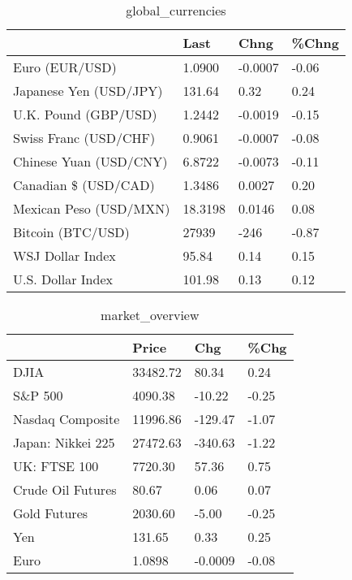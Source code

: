 \documentclass{article}%
\begin{document}
%


\begin{table}[htbp]%
\caption{global\_currencies}%
\centering%
\begin{adjustbox}{width=1\textwidth}%
\begin{tabular}{llll}
\toprule
                       &    Last &    Chng & \%Chng \\
\midrule
        Euro (EUR/USD) &  1.0900 & -0.0007 & -0.06 \\
Japanese Yen (USD/JPY) &  131.64 &    0.32 &  0.24 \\
  U.K. Pound (GBP/USD) &  1.2442 & -0.0019 & -0.15 \\
 Swiss Franc (USD/CHF) &  0.9061 & -0.0007 & -0.08 \\
Chinese Yuan (USD/CNY) &  6.8722 & -0.0073 & -0.11 \\
  Canadian \$ (USD/CAD) &  1.3486 &  0.0027 &  0.20 \\
Mexican Peso (USD/MXN) & 18.3198 &  0.0146 &  0.08 \\
     Bitcoin (BTC/USD) &   27939 &    -246 & -0.87 \\
      WSJ Dollar Index &   95.84 &    0.14 &  0.15 \\
     U.S. Dollar Index &  101.98 &    0.13 &  0.12 \\
\bottomrule
\end{tabular}
%
\end{adjustbox}%
\end{table}

%


\begin{table}[htbp]%
\caption{market\_overview}%
\centering%
\begin{adjustbox}{width=1\textwidth}%
\begin{tabular}{llll}
\toprule
                  &    Price &     Chg &  \%Chg \\
\midrule
             DJIA & 33482.72 &   80.34 &  0.24 \\
          S\&P 500 &  4090.38 &  -10.22 & -0.25 \\
 Nasdaq Composite & 11996.86 & -129.47 & -1.07 \\
Japan: Nikkei 225 & 27472.63 & -340.63 & -1.22 \\
     UK: FTSE 100 &  7720.30 &   57.36 &  0.75 \\
Crude Oil Futures &    80.67 &    0.06 &  0.07 \\
     Gold Futures &  2030.60 &   -5.00 & -0.25 \\
              Yen &   131.65 &    0.33 &  0.25 \\
             Euro &   1.0898 & -0.0009 & -0.08 \\
\bottomrule
\end{tabular}
%
\end{adjustbox}%
\end{table}

%
\end{document}
